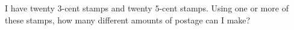 I have twenty $3$-cent stamps and twenty $5$-cent stamps. Using one or more of these stamps, how many different amounts of postage can I make?
